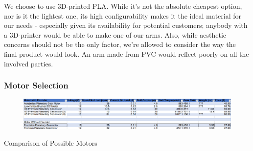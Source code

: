 





We choose to use 3D-printed PLA. While it's not the absolute cheapest option, nor is it the lightest one, its high configurability makes it the ideal material for our needs - especially given its availability for potential customers; anybody with a 3D-printer would be able to make one of our arms. Also, while aesthetic concerns should not be the only factor, we're allowed to consider the way the final product would look. An arm made from PVC would reflect poorly on all the involved parties.


\subsubsection{Motor Selection}
\begin{table}[H]
	\begin{figure}[H]
		\includegraphics[width=\textwidth]{Pictures/motor_chart}
	\end{figure}
	\caption{Comparison of Possible Motors}
	\label{tbl:Motor_Chart}
\end{table}


